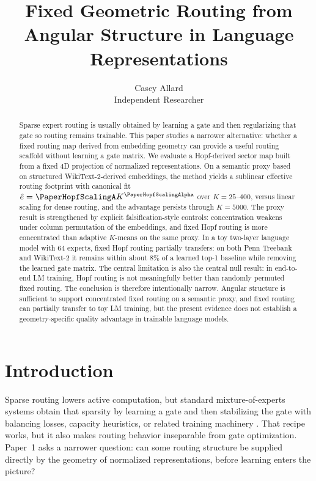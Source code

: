 \documentclass[11pt,letterpaper]{article}
\title{\bfseries Fixed Geometric Routing from Angular Structure in Language Representations}
\author{Casey Allard\\Independent Researcher}
\date{}
\begin{document}
\maketitle

\begin{abstract}
Sparse expert routing is usually obtained by learning a gate and then regularizing that gate so routing remains trainable. This paper studies a narrower alternative: whether a fixed routing map derived from embedding geometry can provide a useful routing scaffold without learning a gate matrix. We evaluate a Hopf-derived sector map built from a fixed 4D projection of normalized representations. On a semantic proxy based on structured WikiText-2-derived embeddings, the method yields a sublinear effective routing footprint with canonical fit $\hat{e}=\PaperHopfScalingA K^{\PaperHopfScalingAlpha}$ over $K=25$--$400$, versus linear scaling for dense routing, and the advantage persists through $K=5000$. The proxy result is strengthened by explicit falsification-style controls: concentration weakens under column permutation of the embeddings, and fixed Hopf routing is more concentrated than adaptive $K$-means on the same proxy. In a toy two-layer language model with 64 experts, fixed Hopf routing partially transfers: on both Penn Treebank and WikiText-2 it remains within about $8\%$ of a learned top-1 baseline while removing the learned gate matrix. The central limitation is also the central null result: in end-to-end LM training, Hopf routing is not meaningfully better than randomly permuted fixed routing. The conclusion is therefore intentionally narrow. Angular structure is sufficient to support concentrated fixed routing on a semantic proxy, and fixed routing can partially transfer to toy LM training, but the present evidence does not establish a geometry-specific quality advantage in trainable language models.
\end{abstract}

\section{Introduction}
Sparse routing lowers active computation, but standard mixture-of-experts systems obtain that sparsity by learning a gate and then stabilizing the gate with balancing losses, capacity heuristics, or related training machinery \citep{shazeer2017outrageously,fedus2022switch}. That recipe works, but it also makes routing behavior inseparable from gate optimization. Paper~1 asks a narrower question: can some routing structure be supplied directly by the geometry of normalized representations, before learning enters the picture?
\end{document}
